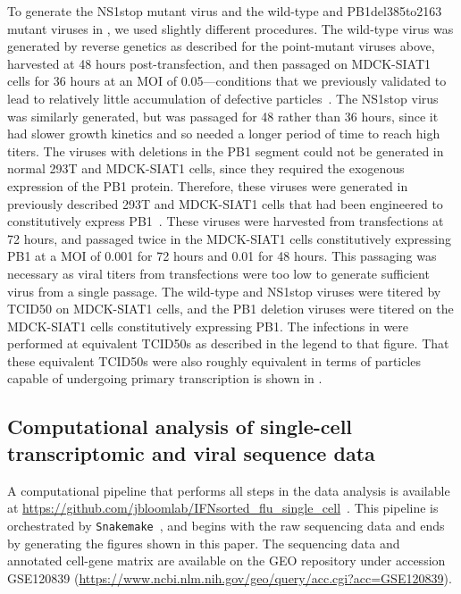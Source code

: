 \documentclass[9pt,lineno]{elife}
\begin{document}
To generate the NS1stop mutant virus and the wild-type and PB1del385to2163 mutant viruses in , we used slightly different procedures.
The wild-type virus was generated by reverse genetics as described for the point-mutant viruses above, harvested at 48 hours post-transfection, and then passaged on MDCK-SIAT1 cells for 36 hours at an MOI of 0.05---conditions that we previously validated to lead to relatively little accumulation of defective particles~\citep{russell2018extreme}.
The NS1stop virus was similarly generated, but was passaged for 48 rather than 36 hours, since it had slower growth kinetics and so needed a longer period of time to reach high titers.
The viruses with deletions in the PB1 segment could not be generated in normal 293T and MDCK-SIAT1 cells, since they required the exogenous expression of the PB1 protein.
Therefore, these viruses were generated in previously described 293T and MDCK-SIAT1 cells that had been engineered to constitutively express PB1~\citep{bloom2010permissive}.
These viruses were harvested from transfections at 72 hours, and passaged twice in the MDCK-SIAT1 cells constitutively expressing PB1 at a MOI of 0.001 for 72 hours and 0.01 for 48 hours. 
This passaging was necessary as viral titers from transfections were too low to generate sufficient virus from a single passage.
The wild-type and NS1stop viruses were titered by TCID50 on MDCK-SIAT1 cells, and the PB1 deletion viruses were titered on the MDCK-SIAT1 cells constitutively expressing PB1.
The infections in  were performed at equivalent TCID50s as described in the legend to that figure.
That these equivalent TCID50s were also roughly equivalent in terms of particles capable of undergoing primary transcription is shown in .

\subsection{Computational analysis of single-cell transcriptomic and viral sequence data}
A computational pipeline that performs all steps in the data analysis is available at \url{https://github.com/jbloomlab/IFNsorted_flu_single_cell}~\citep{russell2018github}. 
This pipeline is orchestrated by \texttt{Snakemake}~\citep{koster2012snakemake}, and begins with the raw sequencing data and ends by generating the figures shown in this paper.
The sequencing data and annotated cell-gene matrix are available on the GEO repository under accession GSE120839 (\url{https://www.ncbi.nlm.nih.gov/geo/query/acc.cgi?acc=GSE120839}).
\end{document}
